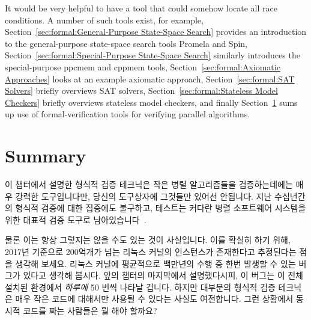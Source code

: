 It would be very helpful to have a tool that could somehow locate
all race conditions.
A number of such tools exist, for example,
Section~\ref{sec:formal:General-Purpose State-Space Search} provides an
introduction to the general-purpose state-space search tools Promela and Spin,
Section~\ref{sec:formal:Special-Purpose State-Space Search}
similarly introduces the special-purpose ppcmem and cppmem tools,
Section~\ref{sec:formal:Axiomatic Approaches}
looks at an example axiomatic approach,
Section~\ref{sec:formal:SAT Solvers}
briefly overviews SAT solvers,
Section~\ref{sec:formal:Stateless Model Checkers}
briefly overviews stateless model checkers,
and finally
Section~\ref{sec:formal:Summary}
sums up use of formal-verification tools for verifying parallel algorithms.
\fi








\section{Summary}
\label{sec:formal:Summary}

이 챕터에서 설명한 형식적 검증 테크닉은 작은 병렬 알고리즘들을 검증하는데에는
매우 강력한 도구입니다만, 당신의 도구상자에 그것들만 있어선 안됩니다.
지난 수십년간의 형식적 검증에 대한 집중에도 불구하고, 테스트는 커다란 병렬
소프트웨어 시스템을 위한 대표적 검증 도구로
남아있습니다~\cite{JonathanCorbet2006lockdep,DaveJones2011Trinity,PaulEMcKenney2016Formal}.
\iffalse

The formal-verification techniques described in this chapter
are very powerful tools for validating small
parallel algorithms, but they should not be the only tools in your toolbox.
Despite decades of focus on formal verification, testing remains the
validation workhorse for large parallel software
systems~\cite{JonathanCorbet2006lockdep,DaveJones2011Trinity,PaulEMcKenney2016Formal}.
\fi

물론 이는 항상 그렇지는 않을 수도 있는 것이 사실입니다.
이를 확실히 하기 위해, 2017년 기준으로 200억개가 넘는 리눅스 커널의
인스턴스가 존재한다고 추정된다는 점을 생각해 보세요.
리눅스 커널에 평균적으로 백만년의 수행 중 한번 발생할 수 있는 버그가 있다고
생각해 봅시다.
앞의 챕터의 마지막에서 설명했다시피, 이 버그는 이 전체 설치된 환경에서
\emph{하루에} 50 번씩 나타날 겁니다.
하지만 대부분의 형식적 검증 테크닉은 매우 작은 코드에 대해서만 사용될 수 있다는
사실도 여전합니다.
그런 상황에서 동시적 코드를 짜는 사람들은 뭘 해야 할까요?
\iffalse

